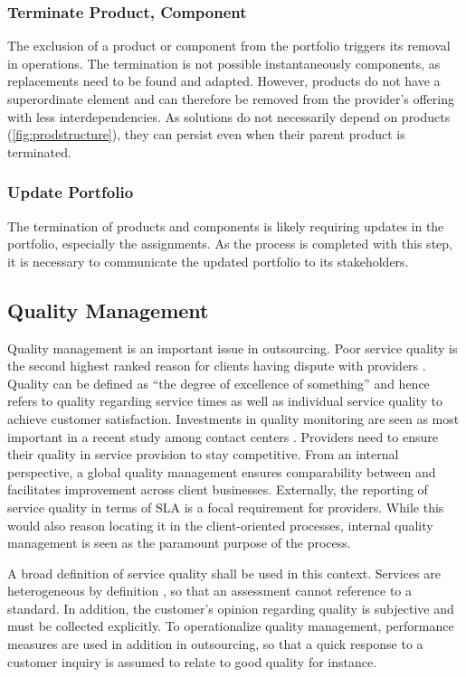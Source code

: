 	\subsubsection{Terminate Product, Component}
	The exclusion of a product or component from the portfolio triggers its removal in operations. The termination is not  possible instantaneously \wrt components, as replacements need to be found and adapted. However, products do not have a superordinate element and can therefore be removed from the provider's offering with less interdependencies. As solutions do not necessarily depend on products (\cf \Fig \ref{fig:prodstructure}), they can persist even when their parent product is terminated. 
	
	
	\subsubsection{Update Portfolio}
	The termination of products and components is likely requiring updates in the portfolio, especially \wrt the assignments. As the process is completed with this step, it is necessary to communicate the updated portfolio to its stakeholders. 
	
	\subsection{Quality Management}
	\label{sec:qualmang}
	
	Quality management is an important issue in outsourcing. Poor service quality is the second highest ranked reason for clients having dispute with providers \citep{deloitte2014outsourcing}. Quality can be defined as \enquote{the degree of excellence of something} \citep{oxfordquality} and hence refers to quality regarding service times as well as individual service quality to achieve customer satisfaction. Investments in quality monitoring are seen as most important in a recent study among contact centers \citep{ccnet2016}. Providers need to ensure their quality in service provision to stay competitive. From an internal perspective, a global quality management ensures comparability between and facilitates improvement across client businesses. Externally, the reporting of service quality in terms of \acrshort{SLA} is a focal requirement for providers. While this would also reason locating it in the client-oriented processes, internal quality management is seen as the paramount purpose of the process. 
	
	A broad definition of service quality shall be used in this context. Services are heterogeneous by definition \citep{cowell1988new}, so that an assessment cannot reference to a standard. In addition, the customer's opinion regarding quality is subjective and must be collected explicitly. To operationalize quality management, performance measures are used in addition in outsourcing, so that a quick response to a customer inquiry is assumed to relate to good quality for instance.
	
